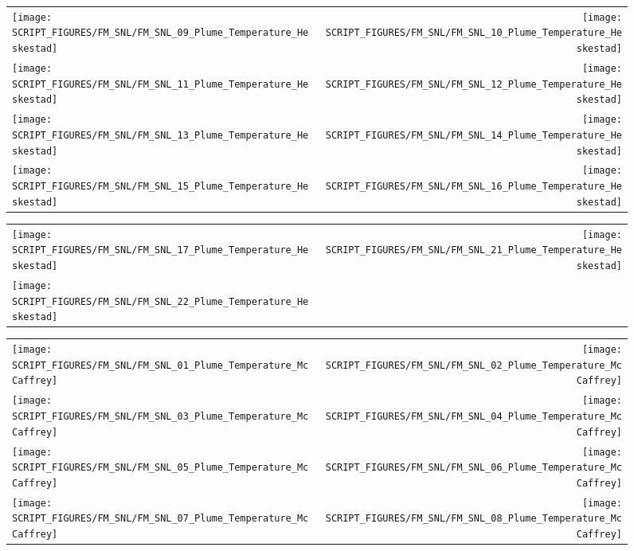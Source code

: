 \begin{figure}[p]
\begin{tabular*}{\textwidth}{l@{\extracolsep{\fill}}r}
\texttt{[image: SCRIPT\_FIGURES/FM\_SNL/FM\_SNL\_09\_Plume\_Temperature\_Heskestad]} &
\texttt{[image: SCRIPT\_FIGURES/FM\_SNL/FM\_SNL\_10\_Plume\_Temperature\_Heskestad]} \\
\texttt{[image: SCRIPT\_FIGURES/FM\_SNL/FM\_SNL\_11\_Plume\_Temperature\_Heskestad]} &
\texttt{[image: SCRIPT\_FIGURES/FM\_SNL/FM\_SNL\_12\_Plume\_Temperature\_Heskestad]} \\
\texttt{[image: SCRIPT\_FIGURES/FM\_SNL/FM\_SNL\_13\_Plume\_Temperature\_Heskestad]} &
\texttt{[image: SCRIPT\_FIGURES/FM\_SNL/FM\_SNL\_14\_Plume\_Temperature\_Heskestad]} \\
\texttt{[image: SCRIPT\_FIGURES/FM\_SNL/FM\_SNL\_15\_Plume\_Temperature\_Heskestad]} &
\texttt{[image: SCRIPT\_FIGURES/FM\_SNL/FM\_SNL\_16\_Plume\_Temperature\_Heskestad]}
\end{tabular*}
\end{figure}

\begin{figure}[p]
\begin{tabular*}{\textwidth}{l@{\extracolsep{\fill}}r}
\texttt{[image: SCRIPT\_FIGURES/FM\_SNL/FM\_SNL\_17\_Plume\_Temperature\_Heskestad]} &
\texttt{[image: SCRIPT\_FIGURES/FM\_SNL/FM\_SNL\_21\_Plume\_Temperature\_Heskestad]} \\
\texttt{[image: SCRIPT\_FIGURES/FM\_SNL/FM\_SNL\_22\_Plume\_Temperature\_Heskestad]}
\end{tabular*}
\end{figure}

\begin{figure}[p]
\begin{tabular*}{\textwidth}{l@{\extracolsep{\fill}}r}
\texttt{[image: SCRIPT\_FIGURES/FM\_SNL/FM\_SNL\_01\_Plume\_Temperature\_McCaffrey]} &
\texttt{[image: SCRIPT\_FIGURES/FM\_SNL/FM\_SNL\_02\_Plume\_Temperature\_McCaffrey]} \\
\texttt{[image: SCRIPT\_FIGURES/FM\_SNL/FM\_SNL\_03\_Plume\_Temperature\_McCaffrey]} &
\texttt{[image: SCRIPT\_FIGURES/FM\_SNL/FM\_SNL\_04\_Plume\_Temperature\_McCaffrey]} \\
\texttt{[image: SCRIPT\_FIGURES/FM\_SNL/FM\_SNL\_05\_Plume\_Temperature\_McCaffrey]} &
\texttt{[image: SCRIPT\_FIGURES/FM\_SNL/FM\_SNL\_06\_Plume\_Temperature\_McCaffrey]} \\
\texttt{[image: SCRIPT\_FIGURES/FM\_SNL/FM\_SNL\_07\_Plume\_Temperature\_McCaffrey]} &
\texttt{[image: SCRIPT\_FIGURES/FM\_SNL/FM\_SNL\_08\_Plume\_Temperature\_McCaffrey]}
\end{tabular*}
\end{figure}


